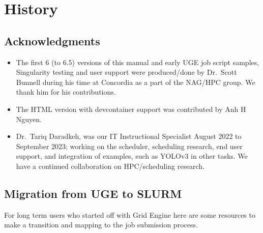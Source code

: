 \documentclass{easychair}
\begin{document}
\appendix

\section{History}

\subsection{Acknowledgments}
\label{sect:acks}

\begin{itemize}
	\item 
The first 6 (to 6.5) versions of this manual and early UGE job script samples,
Singularity testing and user support were produced/done by Dr.~Scott Bunnell
during his time at Concordia as a part of the NAG/HPC group. We thank
him for his contributions.
	\item 
The HTML version with devcontainer support was contributed by Anh H Nguyen.
	\item 
Dr.~Tariq Daradkeh, was our IT Instructional Specialist August 2022 to September 2023;
working on the scheduler, scheduling research, end user support, and integration of
examples, such as YOLOv3 in  other tasks. We have a continued
collaboration on HPC/scheduling research.
\end{itemize}

\subsection{Migration from UGE to SLURM}
\label{appdx:uge-to-slurm}

For long term users who started off with Grid Engine here are some resources
to make a transition and mapping to the job submission process.
\end{document}

